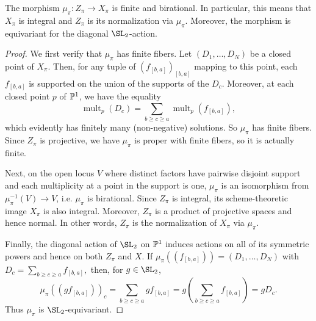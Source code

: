 \documentclass[11pt,reqno]{amsart}
\begin{document}
\begin{lemma}\label{lem: finiteness_mu}
    The morphism $\mu_\pi\colon Z_\pi\to X_\pi$ is finite and birational. In particular, this means that $X_\pi$ is integral and $Z_\pi$ is its normalization via $\mu_\pi$. Moreover, the morphism is equivariant for the diagonal $\SL_2$-action.
\end{lemma}
\begin{proof}
    We first verify that $\mu_\pi$ has finite fibers. Let $(D_1,\ldots, D_N)$ be a closed point of $X_\pi$. Then, for any tuple of $(f_{[b,a]})_{[b,a]}$ mapping to this point, each $f_{[b,a]}$ is supported on the union of the supports of the $D_c$. Moreover, at each closed point $p$ of $\mathbb P^1$, we have the equality \[\operatorname{mult}_p(D_c)=\sum_{b\geq c\geq a}\operatorname{mult}_p(f_{[b,a]}),\] which evidently has finitely many (non-negative) solutions. So $\mu_\pi$ has finite fibers. Since $Z_\pi$ is projective, we have $\mu_\pi$ is proper with finite fibers, so it is actually finite.

    Next, on the open locus $V$ where distinct factors have pairwise disjoint support and each multiplicity at a point in the support is one, $\mu_\pi$ is an isomorphism from $\mu_{\pi}^{-1}(V)\to V$, i.e. $\mu_\pi$ is birational. Since $Z_\pi$ is integral, its scheme-theoretic image $X_\pi$ is also integral. Moreover, $Z_\pi$ is a product of projective spaces and hence normal. In other words, $Z_\pi$ is the normalization of $X_\pi$ via $\mu_\pi$. 

    Finally, the diagonal action of $\SL_2$ on $\mathbb P^1$ induces actions on all of its symmetric powers and hence on both $Z_\pi$ and $X$. If $\mu_\pi((f_{[b,a]}))=(D_1,\ldots,D_N)$ with $D_c=\sum_{b\ge c\ge a}f_{[b,a]},$ then, for $g\in \SL_2$,
\[\mu_\pi((gf_{[b,a]}))_c=\sum_{b\ge c\ge a}gf_{[b,a]}=g\left(\sum_{b\ge c\ge a}f_{[b,a]}\right)=gD_c.\]
Thus $\mu_\pi$ is $\SL_2$-equivariant.
\end{proof}
\end{document}
